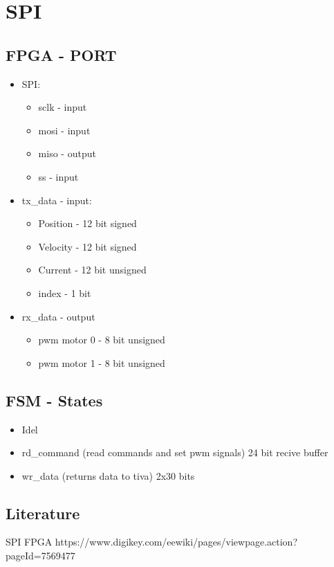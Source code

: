 \documentclass[../main]{subfiles}
\begin{document}
\section{SPI}
\label{sec:indledning}

\subsection{FPGA - PORT}
\begin{itemize}
  \item SPI:
  \begin{itemize}
    \item sclk - input
    \item mosi - input
    \item miso - output
    \item ss - input
  \end{itemize}
  \item tx\_data - input:
  \begin{itemize}
    \item Position - 12 bit signed
    \item Velocity - 12 bit signed
    \item Current - 12 bit unsigned
    \item index - 1 bit
  \end{itemize}
  \item rx\_data - output
  \begin{itemize}
    \item pwm motor 0 - 8 bit unsigned
    \item pwm motor 1 - 8 bit unsigned

  \end{itemize}

\end{itemize}

\subsection{FSM - States}
\begin{itemize}
  \item Idel
  \item rd\_command (read commands and set pwm signals) 24 bit recive buffer
  \item wr\_data (returns data to tiva) 2x30 bits
\end{itemize}

\subsection{Literature}
SPI FPGA https://www.digikey.com/eewiki/pages/viewpage.action?pageId=7569477
\end{document}
